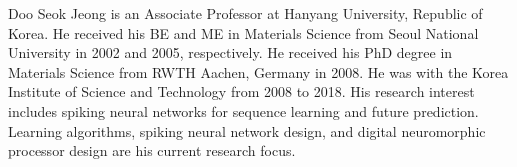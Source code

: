 \documentclass[10pt,journal]{IEEEtran}
\begin{document}
\begin{IEEEbiography}{Doo Seok Jeong} is an Associate Professor at Hanyang University, Republic of Korea. He received his BE and ME in Materials Science from Seoul National University in 2002 and 2005, respectively. He received his PhD degree in Materials Science from RWTH Aachen, Germany in 2008. He was with the Korea Institute of Science and Technology from 2008 to 2018. His research interest includes spiking neural networks for sequence learning and future prediction. Learning algorithms, spiking neural network design, and digital neuromorphic processor design are his current research focus.
\end{IEEEbiography}
\end{document}
